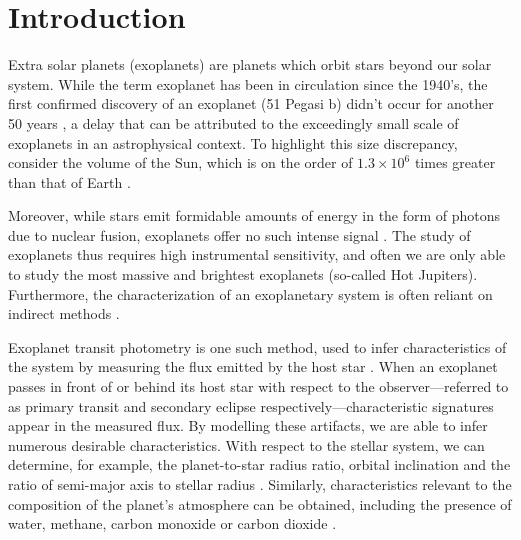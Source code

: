 \documentclass[twocolumn]{aastex61}
\begin{document}

\section{Introduction}
\label{sec:intro}
Extra solar planets (exoplanets) are planets which orbit stars beyond our solar system. While the term exoplanet has been in circulation since the 1940's, the first confirmed discovery of an exoplanet (51 Pegasi b) didn't occur for another 50 years \citep{vandenbos1943,mayor1995}, a delay that can be attributed to the exceedingly small scale of exoplanets in an astrophysical context. To highlight this size discrepancy, consider the volume of the Sun, which is on the order of $1.3\times 10^{6}$ times greater than that of Earth \citep{carroll2006}.

Moreover, while stars emit formidable amounts of energy in the form of photons due to nuclear fusion, exoplanets offer no such intense signal \citep{carroll2006}. The study of exoplanets thus requires high instrumental sensitivity, and often we are only able to study the most massive and brightest exoplanets (so-called Hot Jupiters). Furthermore, the characterization of an exoplanetary system is often reliant on indirect methods \citep{ingalls2016}.

Exoplanet transit photometry is one such method, used to infer characteristics of the system by measuring the flux emitted by the host star \citep{ingalls2016}. When an exoplanet passes in front of or behind its host star with respect to the observer---referred to as primary transit and secondary eclipse respectively---characteristic signatures appear in the measured flux. By modelling these artifacts, we are able to infer numerous desirable characteristics. With respect to the stellar system, we can determine, for example, the planet-to-star radius ratio, orbital inclination and the ratio of semi-major axis to stellar radius \citep{krick2016}. Similarly, characteristics relevant to the composition of the planet's atmosphere can be obtained, including the presence of water, methane, carbon monoxide or carbon dioxide \citep{evans2015}.
\end{document}
